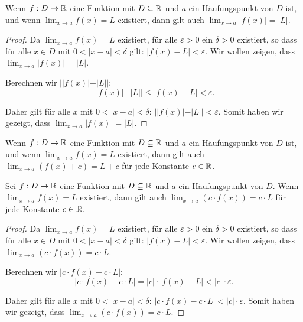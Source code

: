 \begin{corollary}
  Wenn $f: D \to \mathbb{R}$ eine Funktion mit $D \subseteq \mathbb{R}$ und $a$ ein Häufungspunkt von $D$ ist, und wenn $\lim_{x \to a} f(x) = L$ existiert, dann gilt auch $\lim_{x \to a} |f(x)| = |L|$.
\end{corollary}

\begin{proof}
  Da $\lim_{x \to a} f(x) = L$ existiert, für alle $\varepsilon > 0$ ein $\delta > 0$ existiert, so dass für alle $x \in D$ mit $0 < |x - a| < \delta$ gilt: $|f(x) - L| < \varepsilon$. Wir wollen zeigen, dass $\lim_{x \to a} |f(x)| = |L|$.

  Berechnen wir $||f(x)| - |L||$:
  \[
    ||f(x)| - |L|| \leq |f(x) - L| < \varepsilon.
  \]

  Daher gilt für alle $x$ mit $0 < |x - a| < \delta$: $||f(x)| - |L|| < \varepsilon$. Somit haben wir gezeigt, dass $\lim_{x \to a} |f(x)| = |L|$.
\end{proof}

\begin{fact}
  Wenn $f: D \to \mathbb{R}$ eine Funktion mit $D \subseteq \mathbb{R}$ und $a$ ein Häufungspunkt von $D$ ist, und wenn $\lim_{x \to a} f(x) = L$ existiert, dann gilt auch $\lim_{x \to a} (f(x) + c) = L + c$ für jede Konstante $c \in \mathbb{R}$.
\end{fact}

\begin{theorem}
  Sei $f: D \to \mathbb{R}$ eine Funktion mit $D \subseteq \mathbb{R}$ und $a$ ein Häufungspunkt von $D$. Wenn $\lim_{x \to a} f(x) = L$ existiert, dann gilt auch $\lim_{x \to a} (c \cdot f(x)) = c \cdot L$ für jede Konstante $c \in \mathbb{R}$.
\end{theorem}

\begin{proof}
  Da $\lim_{x \to a} f(x) = L$ existiert, für alle $\varepsilon > 0$ ein $\delta > 0$ existiert, so dass für alle $x \in D$ mit $0 < |x - a| < \delta$ gilt: $|f(x) - L| < \varepsilon$. Wir wollen zeigen, dass $\lim_{x \to a} (c \cdot f(x)) = c \cdot L$.

  Berechnen wir $|c \cdot f(x) - c \cdot L|$:
  \[
    |c \cdot f(x) - c \cdot L| = |c| \cdot |f(x) - L| < |c| \cdot \varepsilon.
  \]

  Daher gilt für alle $x$ mit $0 < |x - a| < \delta$: $|c \cdot f(x) - c \cdot L| < |c| \cdot \varepsilon$. Somit haben wir gezeigt, dass $\lim_{x \to a} (c \cdot f(x)) = c \cdot L$.
\end{proof}